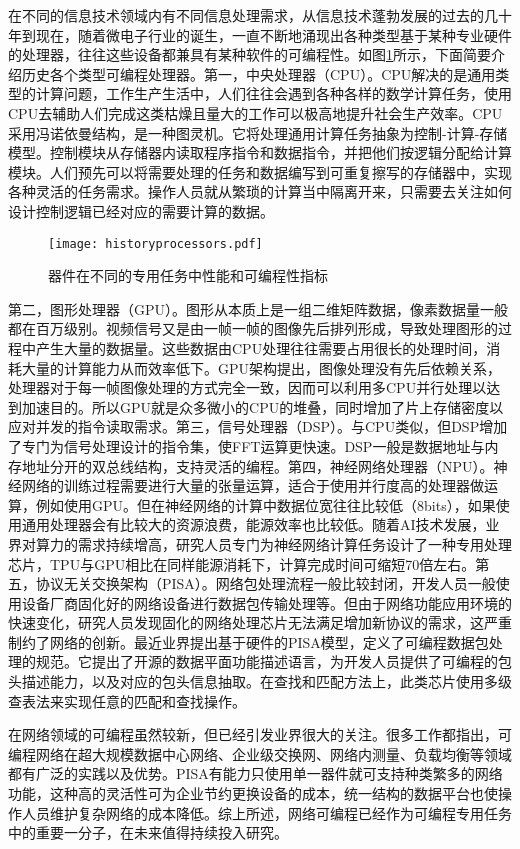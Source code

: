 在不同的信息技术领域内有不同信息处理需求，从信息技术蓬勃发展的过去的几十年到现在，随着微电子行业的诞生，一直不断地涌现出各种类型基于某种专业硬件的处理器，往往这些设备都兼具有某种软件的可编程性。如图\ref{fig:historyprocessors}所示，下面简要介绍历史各个类型可编程处理器。第一，中央处理器（CPU）。CPU解决的是通用类型的计算问题，工作生产生活中，人们往往会遇到各种各样的数学计算任务，使用CPU去辅助人们完成这类枯燥且量大的工作可以极高地提升社会生产效率。CPU采用冯诺依曼结构，是一种图灵机。它将处理通用计算任务抽象为控制-计算-存储模型。控制模块从存储器内读取程序指令和数据指令，并把他们按逻辑分配给计算模块。人们预先可以将需要处理的任务和数据编写到可重复擦写的存储器中，实现各种灵活的任务需求。操作人员就从繁琐的计算当中隔离开来，只需要去关注如何设计控制逻辑已经对应的需要计算的数据。
\begin{figure}[!ht]
	\centering
	\texttt{[image: historyprocessors.pdf]}
	\caption{器件在不同的专用任务中性能和可编程性指标} \label{fig:historyprocessors}
\end{figure}
第二，图形处理器（GPU）。图形从本质上是一组二维矩阵数据，像素数据量一般都在百万级别。视频信号又是由一帧一帧的图像先后排列形成，导致处理图形的过程中产生大量的数据量。这些数据由CPU处理往往需要占用很长的处理时间，消耗大量的计算能力从而效率低下。GPU架构提出，图像处理没有先后依赖关系，处理器对于每一帧图像处理的方式完全一致，因而可以利用多CPU并行处理以达到加速目的。所以GPU就是众多微小的CPU的堆叠，同时增加了片上存储密度以应对并发的指令读取需求。第三，信号处理器（DSP）。与CPU类似，但DSP增加了专门为信号处理设计的指令集，使FFT运算更快速。DSP一般是数据地址与内存地址分开的双总线结构，支持灵活的编程。第四，神经网络处理器（NPU）。神经网络的训练过程需要进行大量的张量运算，适合于使用并行度高的处理器做运算，例如使用GPU。但在神经网络的计算中数据位宽往往比较低（8bits），如果使用通用处理器会有比较大的资源浪费，能源效率也比较低。随着AI技术发展，业界对算力的需求持续增高，研究人员专门为神经网络计算任务设计了一种专用处理芯片，TPU与GPU相比在同样能源消耗下，计算完成时间可缩短70倍左右。第五，协议无关交换架构（PISA）。网络包处理流程一般比较封闭，开发人员一般使用设备厂商固化好的网络设备进行数据包传输处理等。但由于网络功能应用环境的快速变化，研究人员发现固化的网络处理芯片无法满足增加新协议的需求，这严重制约了网络的创新。最近业界提出基于硬件的PISA模型，定义了可编程数据包处理的规范。它提出了开源的数据平面功能描述语言，为开发人员提供了可编程的包头描述能力，以及对应的包头信息抽取。在查找和匹配方法上，此类芯片使用多级查表法来实现任意的匹配和查找操作。



在网络领域的可编程虽然较新，但已经引发业界很大的关注。很多工作都指出，可编程网络在超大规模数据中心网络、企业级交换网、网络内测量、负载均衡等领域都有广泛的实践以及优势。PISA有能力只使用单一器件就可支持种类繁多的网络功能，这种高的灵活性可为企业节约更换设备的成本，统一结构的数据平台也使操作人员维护复杂网络的成本降低。综上所述，网络可编程已经作为可编程专用任务中的重要一分子，在未来值得持续投入研究。

